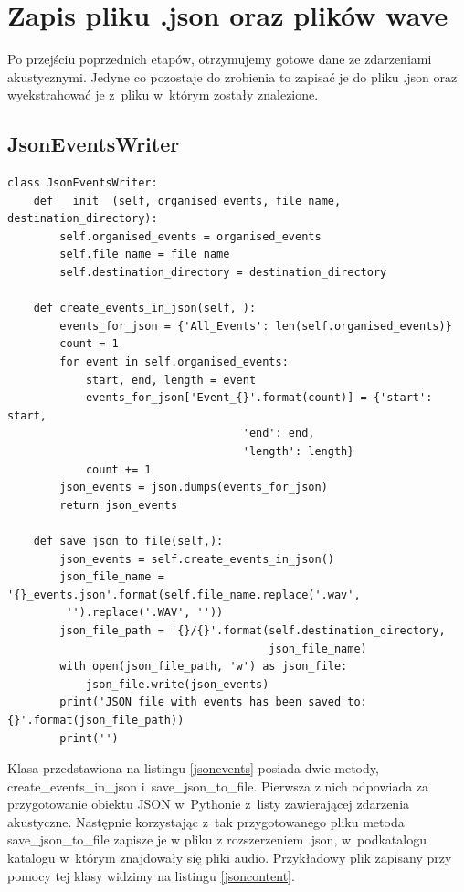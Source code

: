 \documentclass[eng,printmode]{mgr}
\begin{document}
\section{Zapis pliku .json oraz plików wave}
Po przejściu poprzednich etapów, otrzymujemy gotowe dane ze zdarzeniami akustycznymi. Jedyne co pozostaje do zrobienia to zapisać je do pliku .json oraz wyekstrahować je z~pliku w~którym zostały znalezione. 

\subsection{JsonEventsWriter}

\begin{minipage}{\linewidth}
\begin{lstlisting}[caption={Fragment kodu źródłowego pliku JsonEventWriter.py,\newline klasa JsonEventsWriter},captionpos=b,label={jsonevents}] 
class JsonEventsWriter:
    def __init__(self, organised_events, file_name, destination_directory):
        self.organised_events = organised_events
        self.file_name = file_name
        self.destination_directory = destination_directory

    def create_events_in_json(self, ):
        events_for_json = {'All_Events': len(self.organised_events)}
        count = 1
        for event in self.organised_events:
            start, end, length = event
            events_for_json['Event_{}'.format(count)] = {'start': start, 
            						'end': end, 
            						'length': length}
            count += 1
        json_events = json.dumps(events_for_json)
        return json_events

    def save_json_to_file(self,):
        json_events = self.create_events_in_json()
        json_file_name = '{}_events.json'.format(self.file_name.replace('.wav',
         '').replace('.WAV', ''))
        json_file_path = '{}/{}'.format(self.destination_directory,
        								json_file_name)
        with open(json_file_path, 'w') as json_file:
            json_file.write(json_events)
        print('JSON file with events has been saved to: {}'.format(json_file_path))
        print('')
\end{lstlisting}
\end{minipage}

Klasa przedstawiona na listingu \ref{jsonevents} posiada dwie metody, create\_events\_in\_json i~save\_json\_to\_file. Pierwsza z nich odpowiada za przygotowanie obiektu JSON w~Pythonie z~listy zawierającej zdarzenia akustyczne. Następnie korzystając z~tak przygotowanego pliku metoda save\_json\_to\_file zapisze je w pliku z rozszerzeniem .json, w~podkatalogu katalogu w~którym znajdowały się pliki audio.  Przykładowy plik zapisany przy pomocy tej klasy widzimy na listingu \ref{jsoncontent}. 
\end{document}
